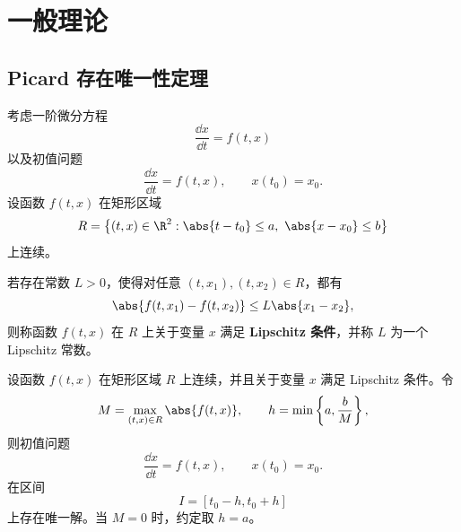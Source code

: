 \setchapterintro{}
\chapter{一般理论}\label{chap:一般理论}

\section{Picard 存在唯一性定理}\label{sec:Picard存在唯一性定理}

考虑一阶微分方程
\[
	\dfrac{\dd x}{\dd t}=f(t,x)
\]
以及初值问题
\[
	\dfrac{\dd x}{\dd t}=f(t,x),
	\qquad
	x(t_0)=x_0.
\]
设函数 $f(t,x)$ 在矩形区域
\[
	R=\bigl\{(t,x)\in\R^2:\abs{t-t_0}\leq a,\ \abs{x-x_0}\leq b\bigr\}
\]
上连续。

\begin{definition}\label{def:关于x的Lipschitz条件}
	若存在常数 $L>0$，使得对任意
	$(t,x_1),(t,x_2)\in R$，都有
	\[
		\abs{f(t,x_1)-f(t,x_2)}
		\leq L\abs{x_1-x_2},
	\]
	则称函数 $f(t,x)$ 在 $R$ 上关于变量 $x$ 满足
	\textbf{Lipschitz 条件}，并称 $L$ 为一个 Lipschitz 常数。
\end{definition}

\begin{theorem}\label{thm:Picard存在唯一性定理}
	设函数 $f(t,x)$ 在矩形区域 $R$ 上连续，并且关于变量 $x$
	满足 Lipschitz 条件。令
	\[
		M=\max_{(t,x)\in R}\abs{f(t,x)},
		\qquad
		h=\min\left\{a,\dfrac{b}{M}\right\},
	\]
	则初值问题
	\[
	\dfrac{\dd x}{\dd t}=f(t,x),
	\qquad
	x(t_0)=x_0.
	\]在区间
	\[
		I=[t_0-h,t_0+h]
	\]
	上存在唯一解。当 $M=0$ 时，约定取 $h=a$。
\end{theorem}

